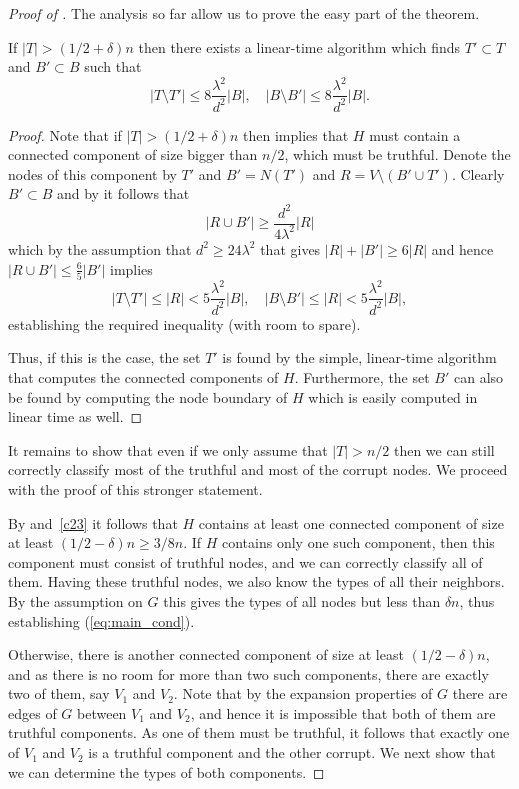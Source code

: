 \documentclass{toc}
\begin{document}
\begin{proof}[Proof of ]
The analysis so far allow us to prove the easy part of the theorem.
\begin{claim}
  If  $|T|>(1/2+\delta)n$ then there exists a linear-time algorithm 
  which finds $T' \subset T$ and $B' \subset B$ such that 
  \[
    |T \setminus T'| \leq 8 \frac{\lambda^2}{d^2} |B| , \quad 
    |B \setminus B'| \leq  8 \frac{\lambda^2}{d^2} |B|. 
  \]
\end{claim}

\begin{proof}
  Note that if $|T|>(1/2+\delta)n$ then  implies
  that $H$ must contain a connected component of size bigger than
  $n/2$, which must be truthful. Denote the nodes of this component
  by $T'$ and $B' = N(T')$ and $R = V \setminus (B' \cup T')$. Clearly
  $B' \subset B$ and by  it follows that
\[
  |R \cup B'| \geq \frac{d^2}{4 \lambda^2} |R|
\]
which by the assumption that $d^2 \geq 24 \lambda^2$ that gives
$|R|+|B'| \geq 6|R|$ and hence $|R \cup B'| \leq \frac{6}{5}|B'|$
implies
 \[
|T \setminus T'| \leq |R| <
5 \frac{\lambda^2}{d^2} |B| , \quad |B \setminus B'| \leq 
|R|<  5 \frac{\lambda^2}{d^2} |B|, 
\]
establishing the required inequality (with room to spare).


Thus, if this is the case, the set $T'$ is found  
%
by the simple, linear-time algorithm that computes the connected
components of $H$. Furthermore, the set $B'$ can also be found by computing the node boundary of $H$ which is easily computed in linear time as well.
\end{proof}
 
%
%
%
%

It remains to show that even if we only
assume that $|T|>n/2$ then we can still
%
correctly classify   %
most of the truthful and   %
most of the %
corrupt nodes. 
We proceed with the proof of this stronger statement.

By  and~\ref{c23} it follows that $H$ contains 
at least one
connected component of size at least $(1/2-\delta)n \geq 3/8 n$.
If $H$ contains only one such component, then this component  
must consist of truthful nodes, and we can
%
correctly classify  %
all of them.
Having these truthful nodes, we also
know the types of all their neighbors. By the assumption on $G$
this gives the types of all nodes 
but less than $\delta n$, thus establishing
(\ref{eq:main_cond}). 
%
%
%
%
%
%
%
%
%
%
%
%
%

 
Otherwise, there is another connected component of size at least
$(1/2-\delta)n$, and as there is no room for more than two such
components, there are exactly two of them, say $V_1$ and $V_2$. Note
that by the expansion properties of $G$ there are edges of $G$ between $V_1$
and $V_2$, and hence it is impossible that both of them are
truthful components.  As one of them must be truthful, it follows
that exactly one of $V_1$ and $V_2$ is a truthful component and the 
other corrupt. We next show that we can determine the types of both
components.  %


\end{proof}
\end{document}
